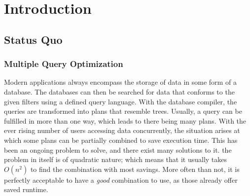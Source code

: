 \chapter{Introduction} %

\label{chapter:introduction} %


\newcommand{\keyword}[1]{\textbf{#1}}
\newcommand{\tabhead}[1]{\textbf{#1}}
\newcommand{\code}[1]{\texttt{#1}}
\newcommand{\file}[1]{\texttt{\bfseries#1}}
\newcommand{\option}[1]{\texttt{\itshape#1}}

\section{Status Quo}

\subsection{Multiple Query Optimization}
Modern applications always encompass the storage of data in some form of a database. The databases can then be searched for data that conforms to the given filters using a defined query language. With the database compiler, the queries are transformed into plans that resemble trees. Usually, a query can be fulfilled in more than one way, which leads to there being many plans. With the ever rising number of users accessing data concurrently, the situation arises at which some plans can be partially combined to save execution time. This has been an ongoing problem to solve, and there exist many solutions to it. the problem in itself is of quadratic nature; which means that it usually takes $O(n^2)$ to find the combination with most savings. More often than not, it is perfectly acceptable to have a \emph{good} combination to use, as those already offer saved runtime. 


